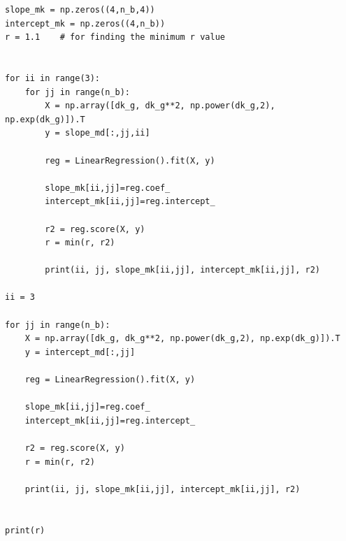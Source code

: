 \documentclass{article}
\begin{document}
\begin{lstlisting}
slope_mk = np.zeros((4,n_b,4))
intercept_mk = np.zeros((4,n_b))
r = 1.1    # for finding the minimum r value


for ii in range(3):
    for jj in range(n_b):
        X = np.array([dk_g, dk_g**2, np.power(dk_g,2), np.exp(dk_g)]).T
        y = slope_md[:,jj,ii]

        reg = LinearRegression().fit(X, y)

        slope_mk[ii,jj]=reg.coef_
        intercept_mk[ii,jj]=reg.intercept_

        r2 = reg.score(X, y)
        r = min(r, r2)

        print(ii, jj, slope_mk[ii,jj], intercept_mk[ii,jj], r2)

ii = 3

for jj in range(n_b):
    X = np.array([dk_g, dk_g**2, np.power(dk_g,2), np.exp(dk_g)]).T
    y = intercept_md[:,jj]

    reg = LinearRegression().fit(X, y)

    slope_mk[ii,jj]=reg.coef_
    intercept_mk[ii,jj]=reg.intercept_

    r2 = reg.score(X, y)
    r = min(r, r2)

    print(ii, jj, slope_mk[ii,jj], intercept_mk[ii,jj], r2)


print(r)\end{lstlisting}
\end{document}
